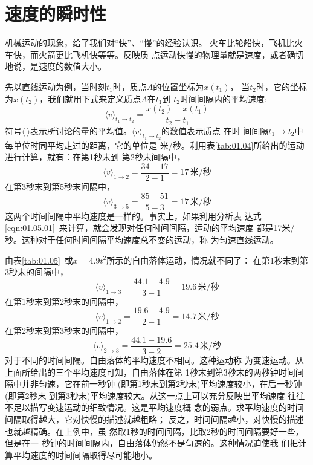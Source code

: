 \documentclass[../outline-of-mechanics.tex]{subfiles}
\begin{document}
\section{速度的瞬时性}\label{sec:01.06}

机械运动的现象，给了我们对“快”、“慢”的经验认识。
火车比轮船快，飞机比火车快，而火箭更比飞机快等等。反映质
点运动快慢的物理量就是速度，或者确切地说，是速度的数值大小。

先以直线运动为例，当时刻$ t_1 $时，质点$ A $的位置坐标为$ x\left(t_1\right) $，
当$ t_2 $时，它的坐标为$ x\left(t_2\right) $，我们就用下式来定义质点$ A $在$ t_1 $到
$ t_2 $时间间隔内的平均速度:
\begin{equation}
  \langle v\rangle_{t_{1} \rightarrow t_{2}}=\frac{x\left(t_{2}\right)-x\left(t_{1}\right)}{t_{2}-t_{1}} \label{eqn:01.06.01}
\end{equation}
符号$\langle ~ \rangle$表示所讨论的量的平均值。$\langle v\rangle_{t_{1} \rightarrow t_{2}}$的数值表示质点
在时
\clearpage
\noindent 间间隔$t_{1} \rightarrow t_{2}$中每单位时同平均走过的距离，它的单位是
米/秒。利用表\ref{tab:01.04}所给出的运动进行计算，就有：在第1秒末到
第2秒末间隔中，
\begin{equation*}
  \langle v\rangle_{1 \rightarrow 2}=\frac{34-17}{2-1}=17\,\text{米/秒}
\end{equation*}
在第3秒末到第5秒末间隔中，
\begin{equation*}
  \langle v\rangle_{3 \rightarrow 5}=\frac{85-51}{5-3}=17\,\text{米/秒}
\end{equation*}
这两个时间间隔中平均速度是一样的。事实上，如果利用分析表
达式\eqref{eqn:01.05.01}~来计算，就会发现对任何时间间隔，运动的平均速度
都是17米/秒。这种对于任何时间间隔平均速度总不变的运动，称
为匀速直线运动。

由表\ref{tab:01.05}~或$x=4.9t^2$所示的自由落体运动，情况就不同了：
在第1秒末到第3秒末的间隔中，
\begin{equation*}
  \langle v\rangle_{1 \rightarrow 3}=\frac{44.1-4.9}{3-1}=19.6\,\text{米/秒}
\end{equation*}
在第1秒末到第2秒末的间隔中，
\begin{equation*}
  \langle v\rangle_{1 \rightarrow 2}=\frac{19.6-4.9}{2-1}=14.7\,\text{米/秒}
\end{equation*}
在第2秒末到第3秒末的间隔中，
\begin{equation*}
  \langle v\rangle_{2 \rightarrow 3}=\frac{44.1-19.6}{3-2}=25.4\,\text{米/秒}
\end{equation*}
对于不同的时间间隔。自由落体的平均速度不相同。这种运动称
为变速运动。从上面所给出的三个平均速度可知，自由落体在第
1秒末到第3秒末的两秒钟时间间隔中并非匀速，它在前一秒钟
(即第1秒末到第2秒末)平均速度较小，在后一秒钟(即第2秒末
到第3秒末)平均速度较大。从这一点上可以充分反映出平均速度
往往不足以描写变速运动的细致情况。这是平均速度概
念的弱点。求平均速度的时间间隔取得越大，它对快慢的描述就越粗略；
反之，时间间隔越小，对快慢的描述也就越精确。在上例中，虽
然取1秒的时间间隔，比取2秒的时间间隔要好一些，但是在一
秒钟的时间间隔内，自由落体仍然不是匀速的。这种情况迫使我
们把计算平均速度的时间间隔取得尽可能地小。
\end{document}
